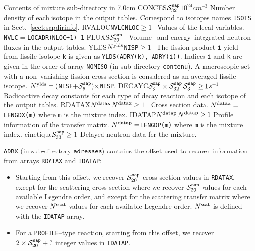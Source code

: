 \begin{DescriptionEnregistrement}{Contents of mixture sub-directory  in }{7.0cm}
\RealEnr
  {CONCES}{$\mathcal{S}^{\tt sap}_{32}$}{$10^{24}cm^{-3}$}
  {Number density of each isotope in the output tables. Correspond to isotopes names {\tt ISOTS}
  in Sect.~\ref{sect:sapdirinfo}.}
\OptRealEnr
  {RVALOC}{\tt NVLC}{{\tt NLOC}$\ge 1$}{~}
  {Values of the local variables. {\tt NVLC}$=${\tt LOCADR(NLOC+1)-1}}
\RealEnr
  {FLUXS}{$\mathcal{S}^{\tt sap}_{20}$}{~}
  {Volume-- and energy--integrated neutron fluxes in the output tables.}
\OptRealEnr
  {YLDS}{$N^{\rm ylds}$}{{\tt NISP}$\ge 1$}{~}
  {The fission product {\tt i} yield from fissile isotope {\tt k} is given as {\tt YLDS(ADRY(k),-ADRY(i))}.
  Indices {\tt i} and {\tt k} are given in the order of array {\tt NOMISO} (in sub-directory {\tt contenu}).
  A macroscopic set with a non--vanishing fission cross section is considered as an averaged fissile isotope.
  \hbox{$N^{\rm ylds}=(${\tt NISF}$+\mathcal{S}^{\tt sap}_6)\times ${\tt NISP}}.}
\OptRealEnr
  {DECAYC}{$\mathcal{S}^{\tt sap}_{3}\times \mathcal{S}^{\tt sap}_{32}$}{$\mathcal{S}^{\tt sap}_3\ge 1$}{$s^{-1}$}
  {Radioactive decay constants for each type of decay reaction and each isotope of the output tables.}
\OptRealEnr
  {RDATAX}{$N^{\rm datax}$}{$N^{\rm datax}\ge 1$}{~}
  {Cross section data.
  \hbox{$N^{\rm datax}=${\tt LENGDX(m)}} where {\tt m} is the mixture index.}
\OptIntEnr
  {IDATAP}{$N^{\rm datap}$}{$N^{\rm datap}\ge 1$}
  {Profile information of the transfer matrix.
  \hbox{$N^{\rm datap}=${\tt LENGDP(m)}} where {\tt m} is the mixture index.}
\OptDirEnr
  {cinetique}{$\mathcal{S}^{\tt sap}_{33}\ge 1$}
  {Delayed neutron data for the mixture.}
\end{DescriptionEnregistrement}

{\tt ADRX} (in sub-directory {\tt adresses}) contains the offset used to recover information from
arrays {\tt RDATAX} and {\tt IDATAP}:
\begin{itemize}
\item Starting from this offset, we recover $\mathcal{S}^{\tt sap}_{20}$ cross section values in {\tt RDATAX},
except for the scattering cross section where we recover $\mathcal{S}^{\tt sap}_{20}$ values for each available
Legendre order, and except for the scattering transfer matrix where we recover $N^{\rm scat}$ values
for each available Legendre order. $N^{\rm scat}$ is defined with the {\tt IDATAP} array.
\item For a {\tt PROFILE}--type reaction, starting from this offset, we recover $2\times \mathcal{S}^{\tt sap}_{20}+7$
integer values in {\tt IDATAP}.
\end{itemize}

